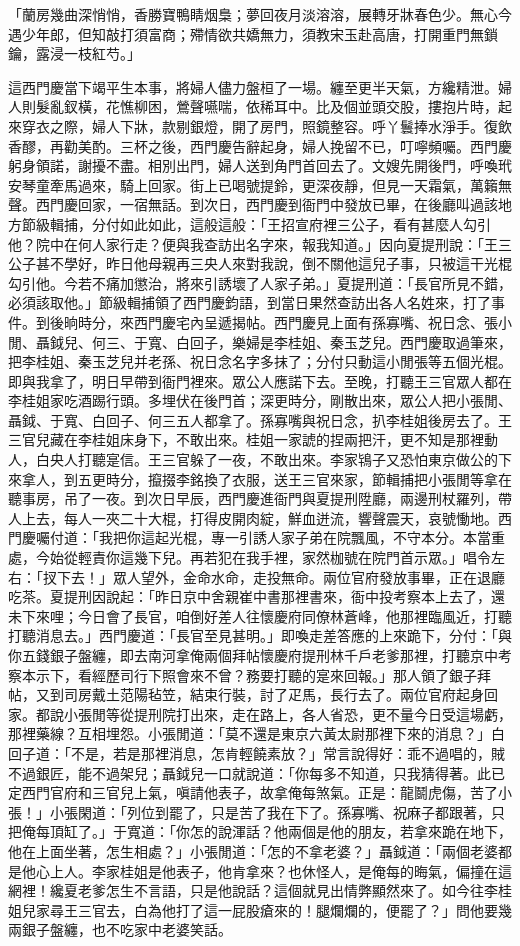 「蘭房幾曲深悄悄，香勝寶鴨睛烟梟；夢回夜月淡溶溶，展轉牙牀春色少。無心今遇少年郎，但知敲打須富商；殢情欲共嬌無力，須教宋玉赴高唐，打開重門無鎖鑰，露浸一枝紅芍。」

這西門慶當下竭平生本事，將婦人儘力盤桓了一場。纏至更半天氣，方纔精泄。婦人則髮亂釵橫，花憔柳困，鶯聲嚥喘，依稀耳中。比及個並頭交股，摟抱片時，起來穿衣之際，婦人下牀，款剔銀燈，開了房門，照鏡整容。呼丫鬟捧水淨手。復飲香醪，再勸美酌。三杯之後，西門慶告辭起身，婦人挽留不已，叮嚀頻囑。西門慶躬身領諾，謝擾不盡。相別出門，婦人送到角門首回去了。文嫂先開後門，呼喚玳安琴童牽馬過來，騎上回家。街上已喝號提鈴，更深夜靜，但見一天霜氣，萬籟無聲。西門慶回家，一宿無話。到次日，西門慶到衙門中發放已畢，在後廳叫過該地方節級輯捕，分付如此如此，這般這般：「王招宣府裡三公子，看有甚麼人勾引他？院中在何人家行走？便與我查訪出名字來，報我知道。」因向夏提刑說：「王三公子甚不學好，昨日他母親再三央人來對我說，倒不關他這兒子事，只被這干光棍勾引他。今若不痛加懲治，將來引誘壞了人家子弟。」夏提刑道：「長官所見不錯，必須該取他。」節級輯捕領了西門慶鈞語，到當日果然查訪出各人名姓來，打了事件。到後晌時分，來西門慶宅內呈遞揭帖。西門慶見上面有孫寡嘴、祝日念、張小閒、聶鉞兒、何三、于寬、白回子，樂婦是李桂姐、秦玉芝兒。西門慶取過筆來，把李桂姐、秦玉芝兒并老孫、祝日念名字多抹了；分付只動這小閒張等五個光棍。即與我拿了，明日早帶到衙門裡來。眾公人應諾下去。至晚，打聽王三官眾人都在李桂姐家吃酒踢行頭。多埋伏在後門首；深更時分，剛散出來，眾公人把小張閒、聶鉞、于寬、白回子、何三五人都拿了。孫寡嘴與祝日念，扒李桂姐後房去了。王三官兒藏在李桂姐床身下，不敢出來。桂姐一家諕的捏兩把汗，更不知是那裡動人，白央人打聽寔信。王三官躲了一夜，不敢出來。李家鴇子又恐怕東京做公的下來拿人，到五更時分，攛掇李銘換了衣服，送王三官來家，節輯捕把小張閒等拿在聽事房，吊了一夜。到次日早辰，西門慶進衙門與夏提刑陞廳，兩邊刑杖羅列，帶人上去，每人一夾二十大棍，打得皮開肉綻，鮮血迸流，響聲震天，哀號慟地。西門慶囑付道：「我把你這起光棍，專一引誘人家子弟在院飄風，不守本分。本當重處，今始從輕責你這幾下兒。再若犯在我手裡，家然枷號在院門首示眾。」唱令左右：「扠下去！」眾人望外，金命水命，走投無命。兩位官府發放事畢，正在退廳吃茶。夏提刑因說起：「昨日京中舍親崔中書那裡書來，衙中投考察本上去了，還未下來哩；今日會了長官，咱倒好差人往懷慶府同僚林蒼峰，他那裡臨風近，打聽打聽消息去。」西門慶道：「長官至見甚明。」即喚走差答應的上來跪下，分付：「與你五錢銀子盤纏，即去南河拿俺兩個拜帖懷慶府提刑林千戶老爹那裡，打聽京中考察本示下，看經歷司行下照會來不曾？務要打聽的寔來回報。」那人領了銀子拜帖，又到司房戴土范陽毡笠，結束行裝，討了疋馬，長行去了。兩位官府起身回家。都說小張閒等從提刑院打出來，走在路上，各人省恐，更不量今日受這場虧，那裡藥線？互相埋怨。小張閒道：「莫不還是東京六黃太尉那裡下來的消息？」白回子道：「不是，若是那裡消息，怎肯輕饒素放？」常言說得好：乖不過唱的，賊不過銀匠，能不過架兒；聶鉞兒一口就說道：「你每多不知道，只我猜得著。此已定西門官府和三官兒上氣，嗔請他表子，故拿俺每煞氣。正是：龍鬬虎傷，苦了小張！」小張閑道：「列位到罷了，只是苦了我在下了。孫寡嘴、祝麻子都跟著，只把俺每頂缸了。」于寬道：「你怎的說渾話？他兩個是他的朋友，若拿來跪在地下，他在上面坐著，怎生相處？」小張閒道：「怎的不拿老婆？」聶鉞道：「兩個老婆都是他心上人。李家桂姐是他表子，他肯拿來？也休怪人，是俺每的晦氣，偏撞在這網裡！纔夏老爹怎生不言語，只是他說話？這個就見出情弊顯然來了。如今往李桂姐兒家尋王三官去，白為他打了這一屁股瘡來的！腿爛爛的，便罷了？」問他要幾兩銀子盤纏，也不吃家中老婆笑話。